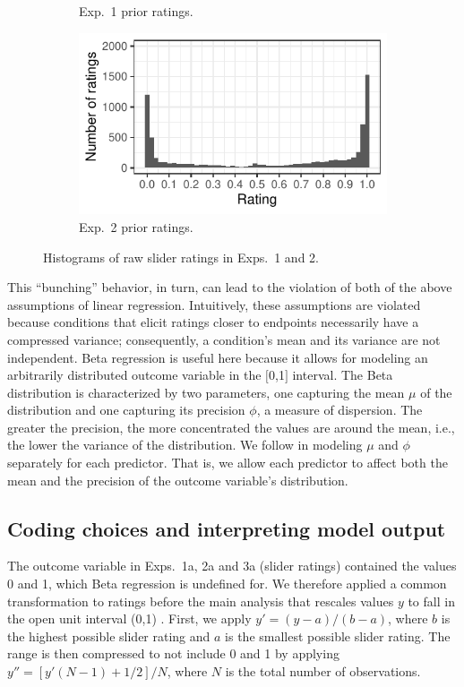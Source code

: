 \documentclass[11pt,fleqn]{article}
\newcommand{\6}{\mbox{$[\hspace*{-.6mm}[$}}
\newcommand{\9}{\mbox{$]\hspace*{-.6mm}]$}}
\begin{document}
\begin{figure}[h!]
\begin{subfigure}{.33\textwidth}
\caption{Exp.~1 prior ratings.}
\label{fig:exp2araw}
\end{subfigure}
\begin{subfigure}{.33\textwidth}
\includegraphics[width=\textwidth]{../../results/2-veridicality2/graphs/bunching}
\caption{Exp.~2 prior ratings.}
\label{fig:exp3araw}
\end{subfigure}
\caption{Histograms of raw slider ratings in Exps.~1 and 2.}
\label{fig:bunch}
\end{figure}

This ``bunching'' behavior, in turn, can lead to the violation of both of the above assumptions of linear regression. 
Intuitively, these assumptions are violated because conditions that elicit ratings closer to endpoints necessarily have a compressed variance; consequently, a condition's mean and its variance are not independent. Beta regression is useful here because it allows for modeling an arbitrarily distributed outcome variable in the $[$0,1$]$ interval. The Beta distribution is characterized by two parameters, one capturing the mean $\mu$ of the distribution and one capturing its precision $\phi$, a measure of dispersion. The greater the precision, the more concentrated the values are around the mean, i.e., the lower the variance of the distribution.  We follow \citet{smithson2006} in modeling $\mu$ and $\phi$ separately for each predictor. That is, we allow each predictor to affect both the mean and the precision of the outcome variable's distribution. 

\subsection{Coding choices and interpreting model output}\label{a-primer}

The outcome variable in Exps.~1a, 2a and 3a (slider ratings) contained the values 0 and 1, which Beta regression is undefined for. We therefore applied a common transformation to ratings before the main analysis that rescales values $y$ to fall in the open unit interval (0,1)  \citep{smithson2006}. First, we apply $y' = (y-a)/(b-a)$, where $b$ is the highest possible slider rating and $a$ is the smallest possible slider rating. The range is then compressed to not include 0 and 1 by applying $y'' = [y'(N-1) + 1/2]/N$, where $N$ is the total number of observations.
\end{document}
